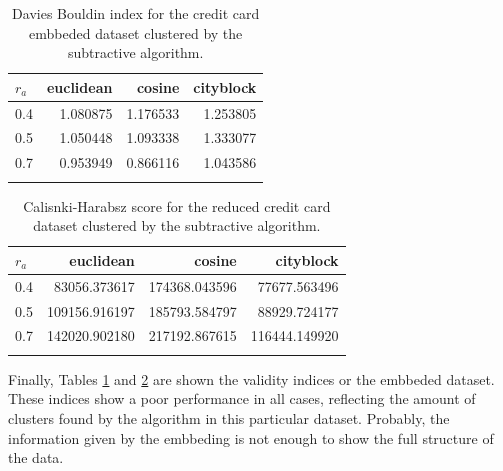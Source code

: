 \documentclass[conference]{IEEEtran}
\begin{document}
\begin{itemize}
    \begin{table}[ht!]
        \centering
        \begin{tabular}{lrrr}
        \toprule
        $r_a$ &  euclidean &    cosine &  cityblock \\
        \midrule
        0.4 &   1.080875 &  1.176533 &   1.253805 \\
        0.5 &   1.050448 &  1.093338 &   1.333077 \\
        0.7 &   0.953949 &  0.866116 &   1.043586 \\
        \bottomrule \\
        \end{tabular}
        \caption{Davies Bouldin index for the credit card embbeded dataset clustered by the subtractive algorithm.}
        \label{tab:ce_db_s}
    \end{table}
    
    \begin{table}[ht!]
        \centering
        \begin{tabular}{lrrr}
        \toprule
        $r_a$ &      euclidean &         cosine &      cityblock \\
        \midrule
        0.4 &   83056.373617 &  174368.043596 &   77677.563496 \\
        0.5 &  109156.916197 &  185793.584797 &   88929.724177 \\
        0.7 &  142020.902180 &  217192.867615 &  116444.149920 \\
        \bottomrule \\
        \end{tabular}
        \caption{Calisnki-Harabsz score for the reduced credit card dataset clustered by the subtractive algorithm.}
        \label{tab:ce_ch_s}
    \end{table}
    
    Finally, Tables \ref{tab:ce_db_s} and \ref{tab:ce_ch_s} are shown the validity indices or the embbeded dataset. These indices show a poor performance in all cases, reflecting the amount of clusters found by the algorithm in this particular dataset. Probably, the information given by the embbeding is not enough to show the full structure of the data.
    

\end{itemize}
\end{document}
